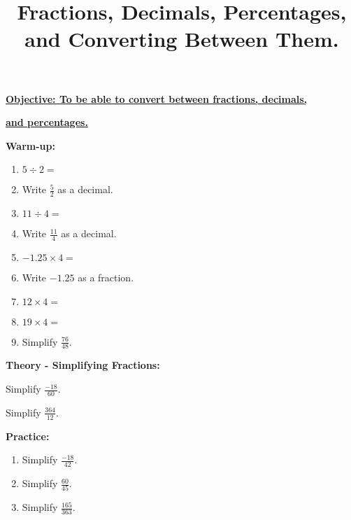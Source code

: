 \documentclass{article}
\begin{document}
\title{Fractions, Decimals, Percentages, and Converting Between Them.}
\date{}

\maketitle
\thispagestyle{empty}

\Large

{\bf \underline{Objective: To be able to convert between fractions, decimals,}}

\textbf{\underline{and percentages.}}

\vspace{5mm}

{\bf Warm-up:}

\vspace{5mm}

\begin{enumerate}
\item $5\div2=$
\item Write $\frac{5}{2}$ as a decimal.
\item $11\div 4=$
\item Write $\frac{11}{4}$ as a decimal.
\item $-1.25\times 4=$
\item Write $-1.25$ as a fraction.
\item $12\times 4=$
\item $19\times 4=$
\item Simplify $\frac{76}{48}$.
\end{enumerate}

\clearpage


{\bf Theory - Simplifying Fractions:}

Simplify $\frac{-18}{60}$.

\vfill

Simplify $\frac{364}{12}$.

\vfill
\clearpage



{\bf Practice:}

\vspace{5mm}

\begin{enumerate}
\item Simplify $\frac{-18}{42}$.
\item Simplify $\frac{60}{45}$.
\item Simplify $\frac{165}{363}$.
\end{enumerate}

\clearpage
\end{document}
